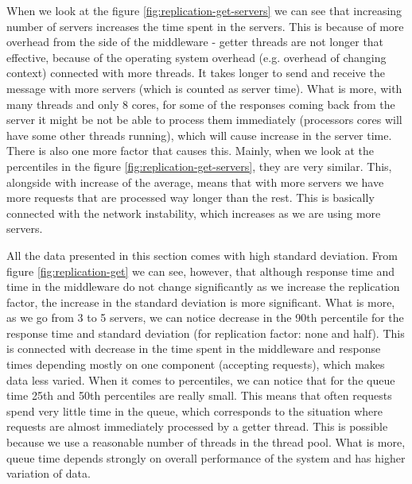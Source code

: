 \documentclass[11pt]{article}
\begin{document}

When we look at the figure \ref{fig:replication-get-servers} we can see that increasing number of servers increases the time spent in the servers. This is because of more overhead from the side of the middleware - getter threads are not longer that effective, because of the operating system overhead (e.g. overhead of changing context) connected with more threads. It takes longer to send and receive the message with more servers (which is counted as server time). What is more, with many threads and only 8 cores, for some of the responses coming back from the server it might be not be able to process them immediately (processors cores will have some other threads running), which will cause increase in the server time. There is also one more factor that causes this. Mainly, when we look at the percentiles in the figure \ref{fig:replication-get-servers}, they are very similar. This, alongside with increase of the average, means that with more servers we have more requests that are processed way longer than the rest. This is basically connected with the network instability, which increases as we are using more servers. 

All the data presented in this section comes with high standard deviation. From figure \ref{fig:replication-get} we can see, however, that although response time and time in the middleware do not change significantly as we increase the replication factor, the increase in the standard deviation is more significant. What is more, as we go from 3 to 5 servers, we can notice decrease in the 90th percentile for the response time and standard deviation (for replication factor: none and half). This is connected with decrease in the time spent in the middleware and response times depending mostly on one component (accepting requests), which makes data less varied. When it comes to percentiles, we can notice that for the queue time 25th and 50th percentiles are really small. This means that often requests spend very little time in the queue, which corresponds to the situation where requests are almost immediately processed by a getter thread. This is possible because we use a reasonable number of threads in the thread pool. What is more, queue time depends strongly on overall performance of the system and has higher variation of data.
\end{document}
